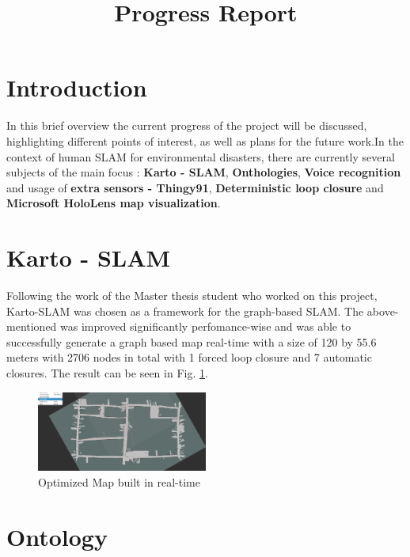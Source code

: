\documentclass[conference]{IEEEtran}
\title{Progress Report}
\begin{document}
\author{
    \and

}

\maketitle
\section{Introduction}
In this brief overview the current progress of the project will be discussed, highlighting different
points of interest, as well as plans for the future work.In the context of human SLAM for environmental disasters, there are currently several subjects of the main focus : \textbf{Karto - SLAM}, \textbf{Onthologies}, \textbf{Voice recognition} and usage of \textbf{extra sensors - Thingy91}, \textbf{Deterministic loop closure} and \textbf{Microsoft HoloLens map visualization}.



\section{Karto - SLAM}
Following the work of the Master thesis student who worked on this project, Karto-SLAM was
chosen as a framework for the graph-based SLAM. The above-mentioned was improved significantly
perfomance-wise and was able to successfully generate a graph based map real-time with a size of
120 by 55.6 meters with 2706 nodes in total with 1 forced loop closure and 7 automatic closures. The result can be seen in Fig. \ref{map}.
\begin{figure}[htbp]
    \centerline{\includegraphics[width=0.5\textwidth,height=\textheight,keepaspectratio]{Pictures/rviz_screenshot_2021_03_22-16_01_59.png}}
    \caption{Optimized Map built in real-time}

    \label{map}

\end{figure}

\section{Ontology}
\end{document}
